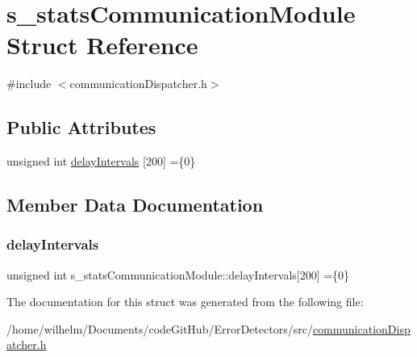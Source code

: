 \hypertarget{structs__stats_communication_module}{}\section{s\+\_\+stats\+Communication\+Module Struct Reference}
\label{structs__stats_communication_module}


{\ttfamily \#include $<$communication\+Dispatcher.\+h$>$}

\subsection*{Public Attributes}
\begin{DoxyCompactItemize}
\item 
unsigned int \hyperlink{structs__stats_communication_module_a19c4cf28c1e3cd24e80398bbf5be89d6}{delay\+Intervals} \mbox{[}200\mbox{]} =\{0\}
\end{DoxyCompactItemize}


\subsection{Member Data Documentation}
\mbox{\label{structs__stats_communication_module_a19c4cf28c1e3cd24e80398bbf5be89d6}} 
\subsubsection{\texorpdfstring{delay\+Intervals}{delayIntervals}}
{\footnotesize\ttfamily unsigned int s\+\_\+stats\+Communication\+Module\+::delay\+Intervals\mbox{[}200\mbox{]} =\{0\}}



The documentation for this struct was generated from the following file\+:\begin{DoxyCompactItemize}
\item 
/home/wilhelm/\+Documents/code\+Git\+Hub/\+Error\+Detectors/src/\hyperlink{communication_dispatcher_8h}{communication\+Dispatcher.\+h}\end{DoxyCompactItemize}
